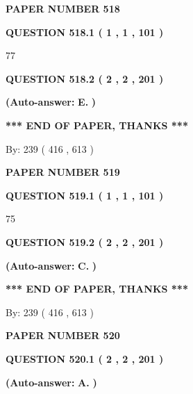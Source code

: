 \documentclass[12pt]{article}
\begin{document}
   
\newpage 
\setcounter{page}{ 
   518001 } 
   
   
 {\textbf{ \Large{ PAPER NUMBER  518  }}}
   
   
   
   
  
  
{\textbf{\large{QUESTION
518.1 
 ( 1 , 1 , 101 )
}}}

77
  
  
{\textbf{\large{QUESTION
518.2 
 ( 2 , 2 , 201 )
}}}
 
 
{\textbf{(Auto-answer:}}
{\textbf{\large{
E.}}}
{\textbf{)}}
 
 
   
   
   
   
\vspace{1.0in} 
{\textbf{\large{ *** END OF PAPER, THANKS *** }}} 
   
   
\hspace{1.0in} By: 
 239 ( 416 ,  613 )
   
   
   
   
\newpage 
\setcounter{page}{ 
   519001 } 
   
   
 {\textbf{ \Large{ PAPER NUMBER  519  }}}
   
   
   
   
  
  
{\textbf{\large{QUESTION
519.1 
 ( 1 , 1 , 101 )
}}}

75
  
  
{\textbf{\large{QUESTION
519.2 
 ( 2 , 2 , 201 )
}}}
 
 
{\textbf{(Auto-answer:}}
{\textbf{\large{
C.}}}
{\textbf{)}}
 
 
   
   
   
   
\vspace{1.0in} 
{\textbf{\large{ *** END OF PAPER, THANKS *** }}} 
   
   
\hspace{1.0in} By: 
 239 ( 416 ,  613 )
   
   
   
   
\newpage 
\setcounter{page}{ 
   520001 } 
   
   
 {\textbf{ \Large{ PAPER NUMBER  520  }}}
   
   
   
   
  
  
{\textbf{\large{QUESTION
520.1 
 ( 2 , 2 , 201 )
}}}
 
 
{\textbf{(Auto-answer:}}
{\textbf{\large{
A.}}}
{\textbf{)}}
 
 
  
\end{document}

